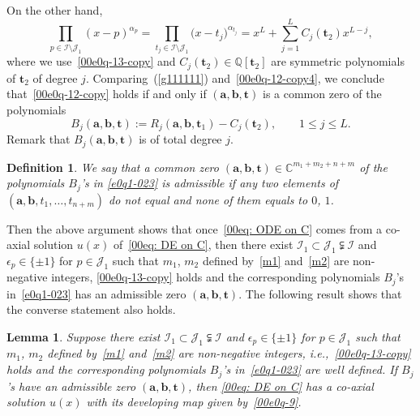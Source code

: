 \documentclass[pdftex]{sigma}
\numberwithin{equation}{section}
\newtheorem{Lemma}[Theorem]{Lemma}
\newtheorem{Definition}[Theorem]{Definition}
\def\Q{\mathbb Q}
\begin{document}
On the other hand,
\begin{equation}\label{00e0q-12-copy4} \prod_{p\in \mathcal{I}\setminus\mathcal{J}_1}(x-p)^{{\alpha}_{p}}=\prod_{t_j\in \mathcal{I}\setminus\mathcal{J}_1}\bigl(x-t_j\bigr)^{{\alpha}_{t_j}}=x^{L}
+\sum_{j=1}^{L}
C_j(\boldsymbol t_2)x^{L-j},\end{equation}
where we use~\eqref{00e0q-13-copy} and
$C_j(\boldsymbol t_2)\in \Q[\boldsymbol t_2]$ are symmetric polynomials of $\boldsymbol t_2$ of degree $j$.
Comparing~(\ref{g111111}) and~\eqref{00e0q-12-copy4}, we conclude that~\eqref{00e0q-12-copy} holds if and only if $(\boldsymbol a, \boldsymbol b, \boldsymbol t)$ is a common zero of the polynomials
\begin{equation}\label{e0q1-023}B_j(\boldsymbol a,\boldsymbol b,\boldsymbol t):=R_j(\boldsymbol a,\boldsymbol b,\boldsymbol t_1)-C_j(\boldsymbol t_2),\qquad 1\leq j\leq L.\end{equation}
Remark that $B_j(\boldsymbol a,\boldsymbol b,\boldsymbol t)$ is of total degree $j$.

\begin{Definition}
We say that a common zero $(\boldsymbol a,\boldsymbol b,\boldsymbol
t)\in\mathbb{C}^{m_1+m_2+n+m}$ of the polynomials $B_j$'s in
\eqref{e0q1-023} is \emph{admissible} if any two elements of
$(\boldsymbol a,\boldsymbol b,t_1,\dots, t_{n+m})$ do not equal and
none of them equals to $0$, $1$.
\end{Definition}

Then the above argument shows that once~\eqref{00eq: ODE on C} comes
from a co-axial solution $u(x)$ of~\eqref{00eq: DE on C}, then there
exist $\mathcal{I}_1\subset\mathcal{J}_1\subsetneqq \mathcal{I}$ and
$\epsilon_p\in \{\pm 1\}$ for $p\in\mathcal{J}_1$ such that $m_1$, $m_2$
defined by~\eqref{m1} and~\eqref{m2} are non-negative integers,
\eqref{00e0q-13-copy} holds and the corresponding polynomials $B_j$'s
in~\eqref{e0q1-023} has an admissible zero $(\boldsymbol a,\boldsymbol
b,\boldsymbol t)$. The following result shows that the converse
statement also holds.

\begin{Lemma}\label{lem3-5}
Suppose there exist
$\mathcal{I}_1\subset\mathcal{J}_1\subsetneqq \mathcal{I}$ and
$\epsilon_p\in \{\pm 1\}$ for $p\in\mathcal{J}_1$ such that $m_1$, $m_2$
defined by~\eqref{m1} and~\eqref{m2} are non-negative integers,
i.e.,~\eqref{00e0q-13-copy} holds and the corresponding polynomials
$B_j$'s in~\eqref{e0q1-023} are well defined. If $B_j$'s have an
admissible zero $(\boldsymbol a,\boldsymbol b,\boldsymbol t)$, then
\eqref{00eq: DE on C} has a co-axial solution $u(x)$ with its
developing map given by~\eqref{00e0q-9}.
\end{Lemma}
\end{document}

